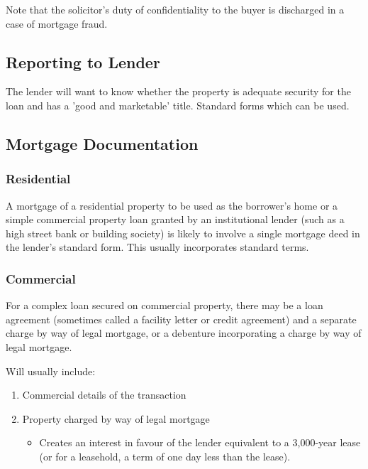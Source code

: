 \documentclass[
]{article}
\providecommand{\tightlist}{%
  \setlength{\itemsep}{0pt}\setlength{\parskip}{0pt}}
\begin{document}
Note that the solicitor's duty of confidentiality to the buyer is
discharged in a case of mortgage fraud.

\hypertarget{reporting-to-lender}{%
\subsection{Reporting to Lender}\label{reporting-to-lender}}

The lender will want to know whether the property is adequate security
for the loan and has a 'good and marketable' title. Standard forms which
can be used.

\hypertarget{mortgage-documentation}{%
\subsection{Mortgage Documentation}\label{mortgage-documentation}}

\hypertarget{residential}{%
\subsubsection{Residential}\label{residential}}

A mortgage of a residential property to be used as the borrower's home
or a simple commercial property loan granted by an institutional lender
(such as a high street bank or building society) is likely to involve a
single mortgage deed in the lender's standard form. This usually
incorporates standard terms.

\hypertarget{commercial}{%
\subsubsection{Commercial}\label{commercial}}

For a complex loan secured on commercial property, there may be a loan
agreement (sometimes called a facility letter or credit agreement) and a
separate charge by way of legal mortgage, or a debenture incorporating a
charge by way of legal mortgage.

Will usually include:

\begin{enumerate}
\tightlist
\item
  Commercial details of the transaction
\item
  Property charged by way of legal mortgage

  \begin{itemize}
  \tightlist
  \item
    Creates an interest in favour of the lender equivalent to a
    3,000-year lease (or for a leasehold, a term of one day less than
    the lease).
  \end{itemize}
\end{enumerate}
\end{document}
